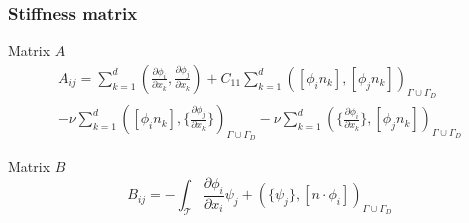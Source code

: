 \documentclass{beamer}
\begin{document}
\begin{frame}
\frametitle{Stiffness matrix}

\begin{block}{Matrix $A$}
\begin{equation} \label{matrix A}
\begin{split}
A_{ij} = \sum_{k=1}^d (\frac{\partial \phi_i}{\partial x_k} , \frac{\partial \phi_j}{\partial x_k}) + C_{11} \sum_{k=1}^d ([\phi_i n_k] , [\phi_j n_k])_{\Gamma \cup \Gamma_D} \\ - \nu \sum_{k=1}^d ([\phi_i n_k] , \lbrace \frac{\partial \phi_j}{\partial x_k} \rbrace)_{\Gamma \cup \Gamma_D} - \nu \sum_{k=1}^d (\lbrace \frac{\partial \phi_i}{\partial x_k} \rbrace , [\phi_j n_k])_{\Gamma \cup \Gamma_D}
\end{split}
\end{equation}
\end{block}

\begin{block}{Matrix $B$}
\begin{equation} \label{matrix B}
B_{ij} = - \int_\mathcal{T} \frac{\partial \phi_i}{\partial x_i} \psi_j + (\lbrace \psi_j \rbrace , [n \cdot \phi_i])_{\Gamma \cup \Gamma_D}
\end{equation}
\end{block}


\end{frame}


\end{document}

